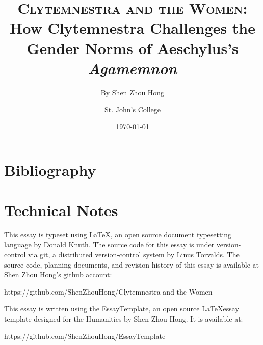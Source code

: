 \documentclass[11pt, letter, final, onecolumn, notitlepage]{article}
\title{
    \textbf{\textsc{Clytemnestra and the Women}}:
    \\ How Clytemnestra Challenges the Gender Norms of Aeschylus's \emph{Agamemnon}
}
\author{By Shen Zhou Hong \and St. John's College}
\date{\today}
\begin{document}
\maketitle



\clearpage
\nocite{*}
\section*{Bibliography}
\printbibliography[heading=none]

\section*{Technical Notes}
This essay is typeset using \LaTeX, an open source document typesetting language
by Donald Knuth. The source code for this essay is under version-control via
git, a distributed version-control system by Linus Torvalds. The source code,
planning documents, and revision history of this essay is available at
Shen Zhou Hong's github account:

https://github.com/ShenZhouHong/Clytemnestra-and-the-Women

\noindent
This essay is written using the EssayTemplate, an open source \LaTeX essay
template designed for the Humanities by Shen Zhou Hong. It is available at:

https://github.com/ShenZhouHong/EssayTemplate

\end{document}
